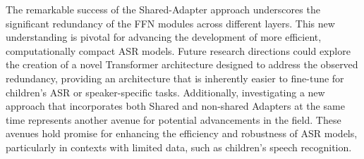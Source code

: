 The remarkable success of the Shared-Adapter approach underscores the significant redundancy of the \ac{FFN} modules across different layers. This new understanding is pivotal for advancing the development of more efficient, computationally compact \ac{ASR} models. Future research directions could explore the creation of a novel Transformer architecture designed to address the observed redundancy, providing an architecture that is inherently easier to fine-tune for children's \ac{ASR} or speaker-specific tasks. Additionally, investigating a new approach that incorporates both Shared and non-shared Adapters at the same time represents another avenue for potential advancements in the field. These avenues hold promise for enhancing the efficiency and robustness of \ac{ASR} models, particularly in contexts with limited data, such as children's speech recognition.